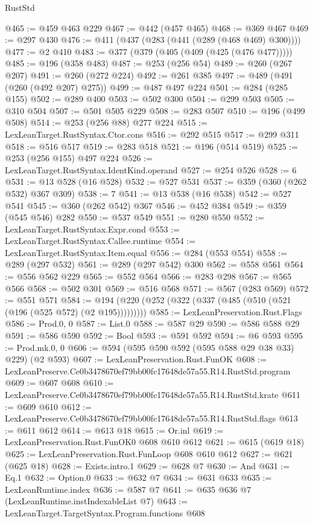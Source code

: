 \begin{lexlean}{RustStd}
\begin{coremodule}
@465 := @459 @463 @229
@467 := @442 (@457 @465)
@468 := @369 @467
@469 := @297 @430
@476 := @411 (@437 (@283 (@441 (@289 (@468 @469) @300))))
@477 := @2 @410
@483 := @377 (@379 (@405 (@409 (@425 (@476 @477)))))
@485 := @196 (@358 @483)
@487 := @253 (@256 @54)
@489 := @260 (@267 @207)
@491 := @260 (@272 @224)
@492 := @261 @385
@497 := @489 (@491 (@260 (@492 @207) @275))
@499 := @487 @497 @224
@501 := @284 (@285 @155)
@502 := @289 @400
@503 := @502 @300
@504 := @299 @503
@505 := @310 @504
@507 := @501 @505 @229
@508 := @283 @507
@510 := @196 (@499 @508)
@514 := @253 (@256 @88) @277 @224
@515 := LexLeanTarget.RustSyntax.Ctor.cons
@516 := @292 @515
@517 := @299 @311
@518 := @516 @517
@519 := @283 @518
@521 := @196 (@514 @519)
@525 := @253 (@256 @155) @497 @224
@526 := LexLeanTarget.RustSyntax.IdentKind.operand
@527 := @254 @526
@528 := 6
@531 := @13 @528 (@16 @528)
@532 := @527 @531
@537 := @359 (@360 (@262 @532) @367 @309)
@538 := 7
@541 := @13 @538 (@16 @538)
@542 := @527 @541
@545 := @360 (@262 @542) @367
@546 := @452 @384
@549 := @359 (@545 @546) @282
@550 := @537 @549
@551 := @280 @550
@552 := LexLeanTarget.RustSyntax.Expr.cond
@553 := LexLeanTarget.RustSyntax.Callee.runtime
@554 := LexLeanTarget.RustSyntax.Item.equal
@556 := @284 (@553 @554)
@558 := @289 (@297 @532)
@561 := @289 (@297 @542) @300
@562 := @558 @561
@564 := @556 @562 @229
@565 := @552 @564
@566 := @283 @298
@567 := @565 @566
@568 := @502 @301
@569 := @516 @568
@571 := @567 (@283 @569)
@572 := @551 @571
@584 := @194 (@220 (@252 (@322 (@337 (@485 (@510 (@521 (@196 (@525 @572) (@2 @195)))))))))
@585 := LexLeanPreservation.Rust.Flags
@586 := Prod.{0, 0}
@587 := List.{0}
@588 := @587 @29
@590 := @586 @588 @29
@591 := @586 @590
@592 := Bool
@593 := @591 @592
@594 := @6 @593
@595 := Prod.mk.{0, 0}
@606 := @594 (@595 @590 @592 (@595 @588 @29 @38 @33) @229) (@2 @593)
@607 := LexLeanPreservation.Rust.FunOK
@608 := LexLeanPreserve.Ce0b3478670ef79bb00fc17648de57a55.R14.RustStd.program
@609 := @607 @608
@610 := LexLeanPreserve.Ce0b3478670ef79bb00fc17648de57a55.R14.RustStd.krate
@611 := @609 @610
@612 := LexLeanPreserve.Ce0b3478670ef79bb00fc17648de57a55.R14.RustStd.flags
@613 := @611 @612
@614 := @613 @18
@615 := Or.inl
@619 := LexLeanPreservation.Rust.FunOK0 @608 @610 @612
@621 := @615 (@619 @18)
@625 := LexLeanPreservation.Rust.FunLoop @608 @610 @612
@627 := @621 (@625 @18)
@628 := Exists.intro.{1}
@629 := @628 @7
@630 := And
@631 := Eq.{1}
@632 := Option.{0}
@633 := @632 @7
@634 := @631 @633
@635 := LexLeanRuntime.index
@636 := @587 @7
@641 := @635 @636 @7 (LexLeanRuntime.instIndexableList @7)
@643 := LexLeanTarget.TargetSyntax.Program.functions @608

\end{coremodule}
\end{lexlean}
